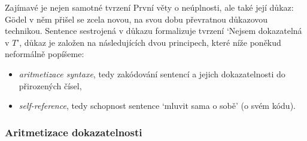 Zajímavé je nejen samotné tvrzení První věty o neúplnosti, ale také její důkaz: Gödel v něm přišel se zcela novou, na svou dobu převratnou důkazovou technikou. Sentence sestrojená v důkazu formalizuje tvrzení `Nejsem dokazatelná v $T$', důkaz je založen na následujících dvou principech, které níže poněkud neformálně popíšeme:
\begin{itemize}
    \item \emph{aritmetizace syntaxe}, tedy zakódování sentencí a jejich dokazatelnosti do přirozených čísel,
    \item \emph{self-reference}, tedy schopnost sentence `mluvit sama o sobě' (o svém kódu).
\end{itemize}
  

\subsubsection*{Aritmetizace dokazatelnosti}

